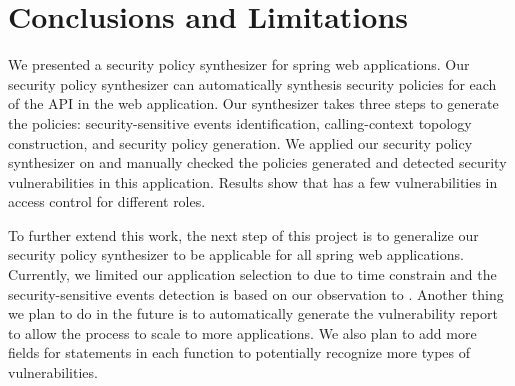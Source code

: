 \section{Conclusions and Limitations}

We presented a security policy synthesizer for spring web applications.
%
Our security policy synthesizer can automatically synthesis security policies
for each of the API in the web application.
%
Our synthesizer takes three steps to generate the policies: security-sensitive
events identification, calling-context topology construction, and security
policy generation.
%
We applied our security policy synthesizer on \lancie and manually checked the
policies generated and detected security vulnerabilities in this application.
%
Results show that \lancie has a few vulnerabilities in access control for
different roles.

To further extend this work, the next step of this project is to generalize our
security policy synthesizer to be applicable for all spring web applications.
%
Currently, we limited our application selection to \lancie due to time
constrain and the security-sensitive events detection is based on our
observation to \lancie.
%
Another thing we plan to do in the future is to automatically generate the
vulnerability report to allow the process to scale to more applications.
%
We also plan to add more fields for statements in each function to potentially
recognize more types of vulnerabilities.
